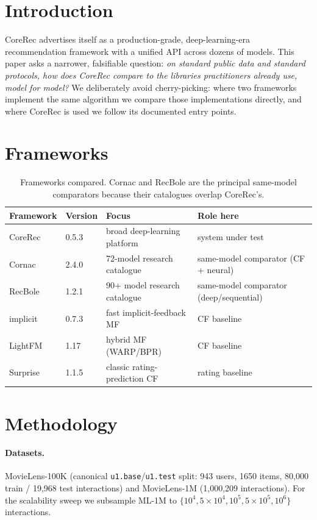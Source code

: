 \documentclass[10pt]{article}
\begin{document}
\section{Introduction}
CoreRec advertises itself as a production-grade, deep-learning-era recommendation
framework with a unified API across dozens of models. This paper asks a narrower,
falsifiable question: \emph{on standard public data and standard protocols, how
does CoreRec compare to the libraries practitioners already use, model for model?}
We deliberately avoid cherry-picking: where two frameworks implement the same
algorithm we compare those implementations directly, and where CoreRec is used we
follow its documented entry points.

\section{Frameworks}
\begin{table}[h]\centering
\begin{tabular}{llll}
\toprule
Framework & Version & Focus & Role here \\
\midrule
CoreRec & 0.5.3 & broad deep-learning platform & system under test \\
Cornac & 2.4.0 & 72-model research catalogue & same-model comparator (CF + neural) \\
RecBole & 1.2.1 & 90+ model research catalogue & same-model comparator (deep/sequential) \\
implicit & 0.7.3 & fast implicit-feedback MF & CF baseline \\
LightFM & 1.17 & hybrid MF (WARP/BPR) & CF baseline \\
Surprise & 1.1.5 & classic rating-prediction CF & rating baseline \\
\bottomrule
\end{tabular}
\caption{Frameworks compared. Cornac and RecBole are the principal same-model
comparators because their catalogues overlap CoreRec's.}
\end{table}

\section{Methodology}
\paragraph{Datasets.} MovieLens-100K (canonical \texttt{u1.base}/\texttt{u1.test}
split: 943 users, 1650 items, 80{,}000 train / 19{,}968 test interactions) and
MovieLens-1M (1{,}000{,}209 interactions). For the scalability sweep we subsample
ML-1M to $\{10^4, 5\!\times\!10^4, 10^5, 5\!\times\!10^5, 10^6\}$ interactions.
\end{document}
